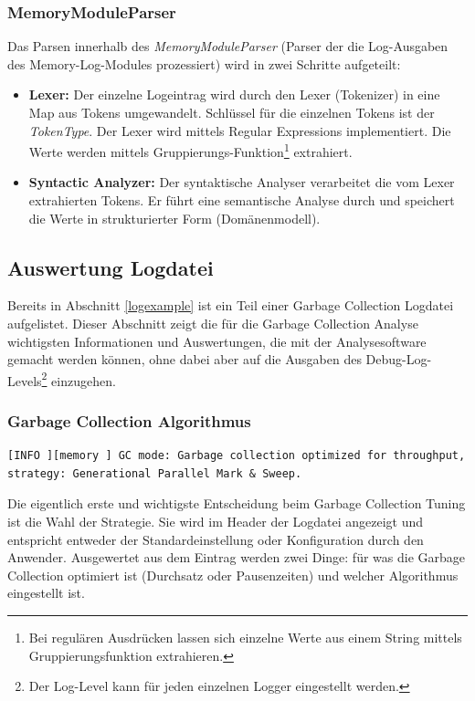 \subsubsection{MemoryModuleParser}
Das Parsen innerhalb des \textit{MemoryModuleParser} (Parser der die Log-Ausgaben des Memory-Log-Modules prozessiert) wird in zwei Schritte aufgeteilt:
\begin{itemize}
\item \textbf{Lexer: }Der einzelne Logeintrag wird durch den Lexer (Tokenizer) in eine Map aus Tokens umgewandelt. Schlüssel für die einzelnen Tokens ist der \textit{TokenType}. Der Lexer wird mittels Regular Expressions implementiert. Die Werte werden mittels Gruppierungs-Funktion\footnote{Bei regulären Ausdrücken lassen sich einzelne Werte aus einem String mittels Gruppierungsfunktion extrahieren.} extrahiert. 
\item \textbf{Syntactic Analyzer: }Der syntaktische Analyser verarbeitet die vom Lexer extrahierten Tokens. Er führt eine semantische Analyse durch und speichert die Werte in strukturierter Form (Domänenmodell).
\end{itemize}

\subsection{Auswertung Logdatei}
Bereits in Abschnitt \ref{logexample} ist ein Teil einer Garbage Collection Logdatei aufgelistet. Dieser Abschnitt zeigt die für die Garbage Collection Analyse wichtigsten Informationen und Auswertungen, die mit der Analysesoftware gemacht werden können, ohne dabei aber auf die Ausgaben des Debug-Log-Levels\footnote{Der Log-Level kann für jeden einzelnen Logger eingestellt werden.} einzugehen.

\subsubsection{Garbage Collection Algorithmus}
\begin{lstlisting}[numbers=none,  framexleftmargin=0mm, caption=Logdatei: Ausgabe initialer Garbage Collection Algorithmus]
[INFO ][memory ] GC mode: Garbage collection optimized for throughput, strategy: Generational Parallel Mark & Sweep.
\end{lstlisting}
Die eigentlich erste und wichtigste Entscheidung beim Garbage Collection Tuning ist die Wahl der Strategie. Sie wird im Header der Logdatei angezeigt und entspricht entweder der Standardeinstellung oder Konfiguration durch den Anwender. Ausgewertet aus dem Eintrag werden zwei Dinge: für was die Garbage Collection optimiert ist (Durchsatz oder Pausenzeiten) und welcher Algorithmus eingestellt ist.
	
